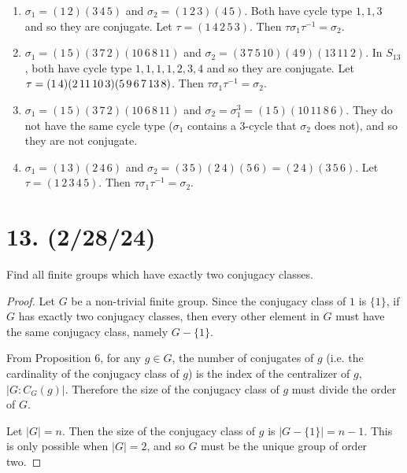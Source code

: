 \documentclass{article}
\begin{document}
\begin{enumerate}[label=(\alph*), itemsep=0em]
    \item $\sigma_1 = (1\, 2)(3\, 4\, 5)$ and $\sigma_2 = (1\, 2\, 3)(4\, 5)$. Both have cycle type $1,1,3$ and so they are conjugate. Let $\tau = (1\, 4\, 2\, 5\, 3)$. Then $\tau \sigma_1 \tau^{-1} = \sigma_2$.
    \item $\sigma_1 = (1\, 5)(3\, 7\, 2)(10\, 6\, 8\, 11)$ and $\sigma_2 = (3\, 7\, 5\, 10)(4\, 9)(13\, 11\, 2)$. In $S_13$, both have cycle type $1,1,1,1,2,3,4$ and so they are conjugate. Let $\tau = \\ (1\, 4)(2\, 11\, 10\, 3)(5\, 9\, 6\, 7\, 13\, 8)$. Then $\tau \sigma_1 \tau^{-1} = \sigma_2$.
    \item $\sigma_1 = (1\, 5)(3\, 7\, 2)(10\, 6\, 8\, 11)$ and $\sigma_2 = \sigma_1^3 = (1\, 5)(10\, 11\, 8\, 6)$. They do not have the same cycle type ($\sigma_1$ contains a 3-cycle that $\sigma_2$ does not), and so they are not conjugate.
    \item $\sigma_1 = (1\, 3)(2\, 4\, 6)$ and $\sigma_2 = (3\, 5)(2\, 4)(5\, 6) = (2\, 4)(3\, 5\, 6)$. Let $\tau = (1\, 2\, 3\, 4\, 5)$. Then $\tau \sigma_1 \tau^{-1} = \sigma_2$.
\end{enumerate}

\section*{13. (2/28/24)}

Find all finite groups which have exactly two conjugacy classes.

\begin{proof}
    Let $G$ be a non-trivial finite group. Since the conjugacy class of $1$ is $\{ 1 \}$, if $G$ has exactly two conjugacy classes, then every other element in $G$ must have the same conjugacy class, namely $G - \{ 1 \}$.

    From Proposition 6, for any $g \in G$, the number of conjugates of $g$ (i.e. the cardinality of the conjugacy class of $g$) is the index of the centralizer of $g$, $|G:C_G(g)|$. Therefore the size of the conjugacy class of $g$ must divide the order of $G$.

    Let $|G| = n$. Then the size of the conjugacy class of $g$ is $|G - \{ 1 \}| = n - 1$. This is only possible when $|G| = 2$, and so $G$ must be the unique group of order two.
\end{proof}
\end{document}

